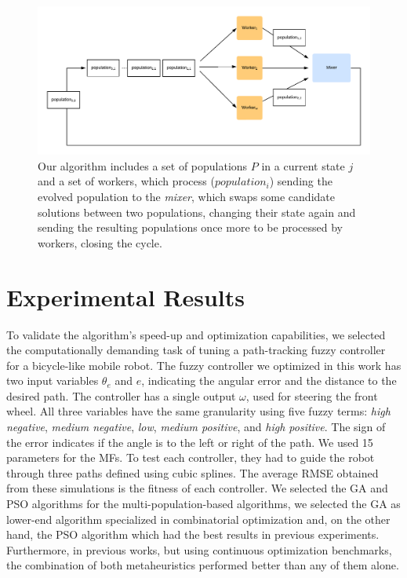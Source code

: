 \documentclass[runningheads]{llncs}
\begin{document}
\begin{figure}
\includegraphics[width=\textwidth]{images/worker-pop}
\caption{ Our algorithm includes a set of populations $P$ in a current state $j$
  and a set of workers, which process ($population_{i}$) sending the evolved
  population to the \emph{mixer}, which swaps some candidate solutions between
  two populations, changing their state again and sending the resulting
  populations once more to be processed by workers, closing the cycle.
}\label{fig:worker-pop}
\end{figure}

\section{Experimental Results}

To validate the algorithm’s speed-up and optimization capabilities, we selected
the computationally demanding task of tuning a path-tracking fuzzy controller
for a bicycle-like mobile robot. The fuzzy controller we optimized in this work
has two input variables $\theta_e$ and $e$, indicating the angular error and
the distance  to the desired path. The controller has a single output $\omega$,
used for steering the front wheel. All three variables have the same
granularity using five fuzzy terms: \emph{high negative}, \emph{medium
negative}, \emph{low}, \emph{medium positive}, and \emph{high positive}. The
sign of the error indicates if the angle is to the left or right of the path.
We used 15 parameters for the MFs. To test each controller, they had to guide
the robot through three paths defined using cubic splines.
The average RMSE obtained from these simulations is the fitness of each 
controller. We selected the GA and PSO algorithms for the multi-population-based
algorithms, we selected the GA as lower-end algorithm specialized in combinatorial 
optimization and, on the other hand, the PSO algorithm which had the best results in
previous experiments. Furthermore, in previous works, but using
continuous optimization benchmarks, the combination of both metaheuristics
performed better than any of them alone.
\end{document}
